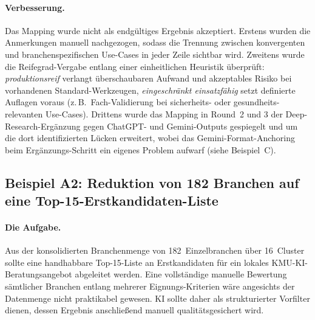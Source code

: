 \documentclass[a4paper,11pt]{article}
\begin{document}
\paragraph{Verbesserung.}
Das Mapping wurde nicht als endgültiges Ergebnis akzeptiert. Erstens
wurden die Anmerkungen manuell nachgezogen, sodass die Trennung
zwischen konvergenten und branchen\-spezifischen Use-Cases in jeder
Zeile sichtbar wird. Zweitens wurde die Reife\-grad-Vergabe entlang
einer einheitlichen Heuristik überprüft: \emph{produktionsreif}
verlangt überschaubaren Aufwand und akzeptables Risiko bei vorhandenen
Standard-Werkzeugen, \emph{eingeschränkt einsatzfähig} setzt definierte
Auflagen voraus (z.\,B.\ Fach-Validierung bei sicherheits- oder
gesundheits-relevanten Use-Cases). Drittens wurde das Mapping in
Round~2 und 3 der Deep-Research-Ergänzung gegen ChatGPT- und
Gemini-Outputs gespiegelt und um die dort identifizierten Lücken
erweitert, wobei das Gemini-Format-Anchoring beim Ergänzungs-Schritt
ein eigenes Problem aufwarf (siehe Beispiel~C).

\subsection{Beispiel A2: Reduktion von 182 Branchen auf eine Top-15-Erstkandidaten-Liste}

\paragraph{Die Aufgabe.}
Aus der konsolidierten Branchenmenge von 182~Einzelbranchen über
16~Cluster sollte eine handhabbare Top-15-Liste an Erstkandidaten für
ein lokales KMU-KI-Beratungsangebot abgeleitet werden. Eine
vollständige manuelle Bewertung sämtlicher Branchen entlang mehrerer
Eignungs-Kriterien wäre angesichts der Datenmenge nicht praktikabel
gewesen. KI sollte daher als strukturierter Vorfilter dienen, dessen
Ergebnis anschließend manuell qualitätsgesichert wird.
\end{document}
